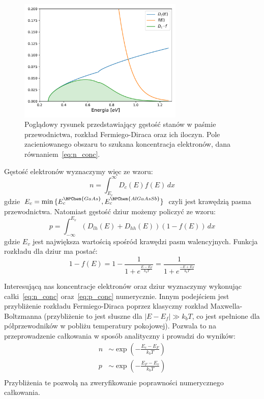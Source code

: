 \documentclass[12pt,openany,a4paper]{book}
\begin{document}
\begin{figure}[h]
	\centering
	\includegraphics[width=0.7\textwidth]{Figures/carriers/integrand.pdf}
	\caption{Poglądowy rysunek przedstawiający gęstość stanów w paśmie przewodnictwa, rozkład
	Fermiego-Diraca oraz ich iloczyn. Pole zacieniowanego obszaru to szukana koncentracja elektronów,
	dana równaniem~\eqref{eq:n_conc}.}
	\label{<label>}
\end{figure}

\noindent Gęstość elektronów wyznaczymy więc ze wzoru:
\begin{equation}
	n = \int_{E_c}^{\infty}D_{c}(E)f(E)\,dx
	\label{eq:n_conc} 
\end{equation}
gdzie \(E_c = \min{\{E_c^{\BPChem{GaAs}},E_c^{\BPChem{AlGaAsSb}}\}}\) czyli jest krawędzią pasma przewodnictwa. 
Natomiast gęstość dziur możemy policzyć ze wzoru:
\begin{equation}
	p = \int_{-\infty}^{E_v}\left(D_{lh}(E)+D_{hh}(E)\right)\left(1-f(E)\right)\,dx
	\label{eq:p_conc}
\end{equation}
gdzie \(E_v\) jest największa wartością spośród krawędzi pasm walencyjnych. Funkcja rozkładu
dla dziur ma postać:
\begin{equation}
	1-f(E) = 1 - \frac{1}{1+e^{\frac{E-E_F}{k_b T}}} = \frac{1}{1+e^{\frac{-E+E_F}{k_b T}}}
	\label{eq:FD_holes}
\end{equation}



Interesującą nas koncentracje elektronów oraz dziur wyznaczymy wykonując
całki~\eqref{eq:n_conc} oraz~\eqref{eq:p_conc} numerycznie. Innym podejściem
jest przybliżenie rozkładu Fermiego-Diraca poprzez klasyczny rozkład Maxwella-Boltzmanna
(przybliżenie to jest słuszne dla \(|E-E_f|\gg k_b T\), co jest spełnione dla półprzewodników w
pobliżu temperatury pokojowej). Pozwala to na przeprowadzenie całkowania w sposób
analityczny i prowadzi do wyników:
\begin{align}
	n&\sim \exp\left(-\frac{E_c-E_F}{k_b T}\right)\\\nonumber
	p&\sim \exp\left(-\frac{E_F-E_v}{k_b T}\right)\\
	\label{eq:approx}
\end{align}
Przybliżenia te pozwolą na zweryfikowanie poprawności numerycznego całkowania.
\end{document}
